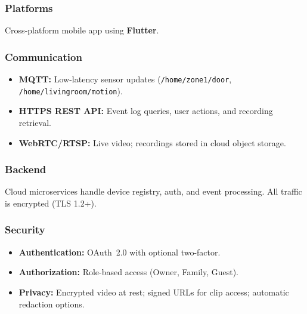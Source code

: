 \documentclass[conference]{IEEEtran}
\begin{document}
\subsubsection{Platforms}
Cross-platform mobile app using \textbf{Flutter}.

\subsubsection{Communication}
\begin{itemize}
  \item \textbf{MQTT:} Low-latency sensor updates (\texttt{/home/zone1/door}, \texttt{/home/livingroom/motion}).
  \item \textbf{HTTPS REST API:} Event log queries, user actions, and recording retrieval.
  \item \textbf{WebRTC/RTSP:} Live video; recordings stored in cloud object storage.
\end{itemize}

\subsubsection{Backend}
Cloud microservices handle device registry, auth, and event processing. All traffic is encrypted (TLS 1.2+).

\subsubsection{Security}
\begin{itemize}
  \item \textbf{Authentication:} OAuth~2.0 with optional two-factor.
  \item \textbf{Authorization:} Role-based access (Owner, Family, Guest).
  \item \textbf{Privacy:} Encrypted video at rest; signed URLs for clip access; automatic redaction options.
\end{itemize}
\end{document}
